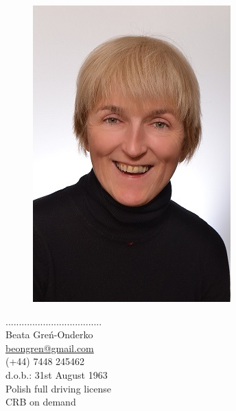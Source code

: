 \documentclass[a4paper,12pt,final]{memoir}
\newcommand{\Sep}{\vspace{1.5em}}
\newenvironment{Career Profile}
	{\ignorespaces\textbf{\color{ForestGreen} Career Profile}}
	{\Sep\ignorespacesafterend}
\newenvironment{Key experience}
	{\ignorespaces\textbf{\color{ForestGreen} Key experience}}
	{\Sep\ignorespacesafterend}
\begin{document}
%
\begin{figure}
	\hfill
	\includegraphics[width=1\columnwidth]{zeby}
	\vspace{-7cm}
\end{figure}

\begin{flushright}
	\small
	\color{White}....................................\\
	\Sep
	\color{Black}
	Beata Greń-Onderko \\
	\url{beongren@gmail.com}  \\
	(+44) 7448 245462\\
	d.o.b.: 31st August 1963\\
	Polish full driving license\\
	CRB on demand
\end{flushright}\normalsize
\framebreak
\end{document}
